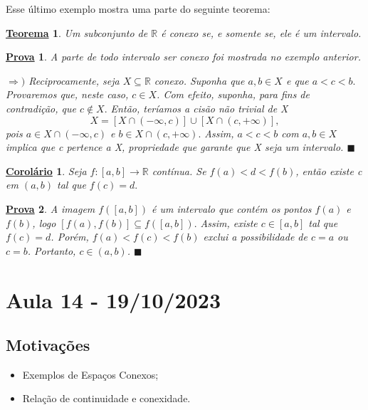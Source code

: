 \documentclass{article}
\newtheorem*{theorem*}{\underline{Teorema}}
\newtheorem*{crl*}{\underline{Corolário}}
\newtheorem*{proof*}{\underline{Prova}}
\renewcommand\qedsymbol{$\blacksquare$}
\begin{document}
Esse último exemplo mostra uma parte do seguinte teorema:
 \begin{theorem*}
    Um subconjunto de \(\mathbb{R}\) é conexo se, e somente se, ele é um intervalo. 
 \end{theorem*}
 \begin{proof*}
   A parte de todo intervalo ser conexo foi mostrada no exemplo anterior.

   \(\Rightarrow )\) Reciprocamente, seja \(X\subseteq{\mathbb{R}}\) conexo. Suponha que \(a, b\in X\) e que
  \(a < c < b.\) Provaremos que, neste caso, \(c\in X\). Com efeito, suponha, para fins de contradição, que
  \(c\not\in X.\) Então, teríamos a cisão não trivial de X
    \[
      X = [X\cap(-\infty, c)]\cup[X\cap(c, +\infty)],
    \]
    pois \(a\in X\cap(-\infty, c)\) e \(b\in X\cap(c, +\infty).\) Assim, \(a < c < b\) com \(a, b\in X\) implica que c pertence a X, propriedade que
garante que X seja um intervalo. \qedsymbol
 \end{proof*}
 \hypertarget{intermediate_value}{\begin{crl*}
     Seja \(f:[a, b]\rightarrow \mathbb{R}\) contínua. Se \(f(a) < d < f(b)\), então existe c em \((a, b)\) tal que \(f(c) = d.\)  
 \end{crl*}}
 \begin{proof*}
   A imagem \(f([a, b])\) é um intervalo que contém os pontos \(f(a)\) e \(f(b)\), logo \([f(a), f(b)]\subseteq{f([a, b])}.\) Assim,
existe \(c\in[a, b]\) tal que \(f(c) = d\). Porém, \(f(a) < f(c) < f(b)\) exclui a possibilidade de \(c = a\) ou \(c = b\). Portanto,
 \(c\in (a, b)\). \qedsymbol
 \end{proof*}
\newpage

\section{Aula 14 - 19/10/2023}
\subsection{Motivações} 
\begin{itemize}
  \item Exemplos de Espaços Conexos;
  \item Relação de continuidade e conexidade.
\end{itemize}
\end{document}
